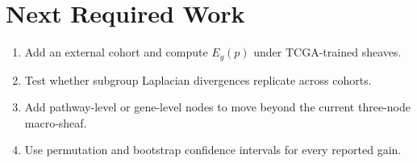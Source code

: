 \documentclass[11pt]{article}
\begin{document}
\section{Next Required Work}
\begin{enumerate}[leftmargin=1.5em]
\item Add an external cohort and compute $E_g(p)$ under TCGA-trained sheaves.
\item Test whether subgroup Laplacian divergences replicate across cohorts.
\item Add pathway-level or gene-level nodes to move beyond the current three-node macro-sheaf.
\item Use permutation and bootstrap confidence intervals for every reported gain.
\end{enumerate}
\end{document}
